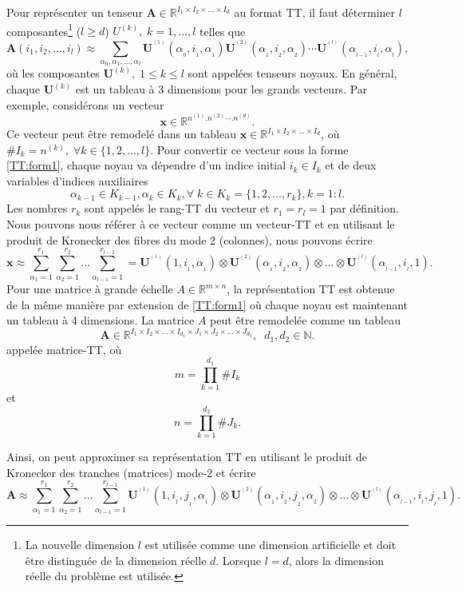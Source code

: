 \documentclass[11pt,a4paper,oneside]{book}
\def\N{\mathbb N}
\def\R{\mathbb R}
\def\RItd{\mathbb{R}^{I_1 \times I_2 \times \ldots \times I_d}}
\newcommand{\mbf}[1]{\mathbf{#1}}
\begin{document}
Pour représenter un tenseur $\mbf{A} \in \RItd$ au format TT, il faut déterminer $ l $ composantes\footnote{La nouvelle dimension $ l $ est utilisée comme une dimension artificielle et doit être distinguée de la dimension réelle $ d $. Lorsque $ l = d $, alors la dimension réelle du problème est utilisée.} 
($l \geq d$)  $U^{(k)},\; k = 1,...,l$ telles que 
\begin{equation}
\label{TT:form1}
\mbf{A}(i_1,i_2,\ldots,i_l) \approx \sum_{\alpha_0,\alpha_1,\ldots,\alpha_l} \mbf{U}^{^{(1)}}(\alpha_{_0},i_{_1},\alpha_{_1})  \mbf{U}^{^{(2)}}(\alpha_{_1},i_{_2},\alpha_{_2})  \cdots  \mbf{U}^{^{(l)}}(\alpha_{_{l-1}},i_{_l},\alpha_{_l}) ,
\end{equation}
où les composantes $\mbf{U}^{(k)}, \; 1 \leq k \leq l$ sont appelées tenseurs noyaux. En général, chaque $\mbf{U}^{(k)}$ est un tableau à 3 dimensions pour les grands vecteurs. Par exemple, considérons un vecteur
$$\mbf{x} \in \R^{n^{(1)}.n^{(2)}\cdots .n^{(d)}}.$$
Ce vecteur peut être remodelé dans un tableau $\mbf{x} \in \RItd$, où $ \#I_k =  n^{(k)},\; \forall k \in \lbrace{1,2,\ldots,l}\rbrace.$  Pour convertir ce vecteur sous la forme \eqref{TT:form1}, chaque noyau va dépendre d'un indice initial $i_k \in I_k$ et de deux variables d'indices auxiliaires $$\alpha_{k-1} \in K_{k-1}, \alpha_k \in K_k, \forall\; k \in K_k = \lbrace{1,2,\ldots, r_k}\rbrace, k = 1:l.$$  Les nombres $r_k$ sont appelés le rang-TT du vecteur et $r_1 = r_l = 1$ par définition. Nous pouvons nous référer à ce vecteur comme un vecteur-TT et en utilisant le produit de Kronecker des fibres du mode 2 (colonnes), nous pouvons écrire
$$
\mbf{x} \approx \sum_{\alpha_1= 1}^{r_1} \sum_{\alpha_2= 1}^{r_2} \ldots \sum_{\alpha_{l-1}= 1}^{r_{l-1}} 
= \mbf{U}^{^{(1)}}(1,i_{_1},\alpha_{_1})\otimes \mbf{U}^{^{(2)}}(\alpha_{_1},i_{_2},\alpha_{_2})\otimes \ldots \otimes  \mbf{U}^{^{(l)}}(\alpha_{_{l-1}},i_{_l},1).$$
\vspace*{0.2cm}
Pour une matrice à grande échelle $A \in \R^{m\times n}$, la représentation TT est obtenue de la même manière par extension de \eqref{TT:form1} où chaque noyau est maintenant un tableau à 4 dimensions. La matrice $ A $ peut être remodelée comme un tableau
$$\mbf{A} \in \R^{I_1\times I_2 \times \ldots \times I_{d_1} \times J_1 \times J_2 \times \ldots \times J_{d_2}},\;\; d_1, d_2 \in \N. $$
appelée matrice-TT, où $$ m = \prod_{k = 1}^{d_1} \#I_k$$ et $$ n = \prod_{k = 1}^{d_2} \#J_k.$$

Ainsi, on peut approximer sa représentation TT en utilisant le produit de Kronecker des tranches (matrices) mode-2 et écrire
$$\mbf{A}\approx\sum_{\alpha_1= 1}^{r_1} \sum_{\alpha_2= 1}^{r_2} \ldots \sum_{\alpha_{l-1}= 1}^{r_{l-1}} \mbf{U}^{^{(1)}}(1,i_{_1},j_{_1},\alpha_{_1})\otimes \mbf{U}^{^{(2)}}(\alpha_{_1},i_{_2},j_{_2},\alpha_{_2})\otimes \ldots \otimes  \mbf{U}^{^{(l)}}(\alpha_{_{l-1}},i_{_l},j_{_l},1).$$
\end{document}
